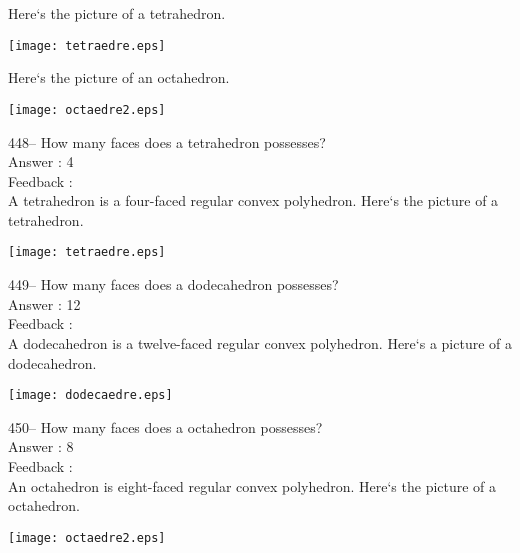 \documentclass[letterpaper, 12pt]{article}
\begin{document}
Here`s the picture of a tetrahedron.\\
    \begin{center}
    \texttt{[image: tetraedre.eps]}
    \end{center}
Here`s the picture of an octahedron.\\
    \begin{center}
    \texttt{[image: octaedre2.eps]}
    \end{center}



448--  How many faces does a tetrahedron possesses?\\

Answer : 4\\

Feedback : \\
A tetrahedron is a four-faced regular convex polyhedron.
Here`s the picture of a tetrahedron.\\
    \begin{center}
    \texttt{[image: tetraedre.eps]}
    \end{center}

449--  How many faces does a dodecahedron possesses?\\

Answer : 12\\

Feedback : \\
A dodecahedron is a twelve-faced regular convex polyhedron. Here`s a picture of a dodecahedron.\\
    \begin{center}
    \texttt{[image: dodecaedre.eps]}
    \end{center}


450--  How many faces does a octahedron possesses?\\

Answer : 8\\

Feedback : \\
An octahedron is eight-faced regular convex polyhedron. Here`s the picture of a octahedron.\\
    \begin{center}
    \texttt{[image: octaedre2.eps]}
    \end{center}
\end{document}
